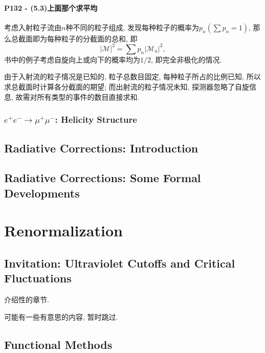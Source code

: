\documentclass[10pt,b5paper,openany]{book}
\begin{document}
\subsection{P132 - (5.3)上面那个求平均}

考虑入射粒子流由$n$种不同的粒子组成, 发现每种粒子的概率为$p_n(\sum p_n = 1)$, 那么总截面即为每种粒子的分截面的总和, 即
\begin{equation}
  |\mathcal{M}|^2 = \sum p_n |\mathcal{M}_n|^2, 
\end{equation}
书中的例子考虑自旋向上或向下的概率均为$1/2$, 即完全非极化的情况. 

由于入射流的粒子情况是已知的, 粒子总数目固定, 每种粒子所占的比例已知, 所以求总截面时计算各分截面的期望; 而出射流的粒子情况未知, 探测器忽略了自旋信息, 故需对所有类型的事件的数目直接求和. 

\section{\texorpdfstring{$e^+e^- \rightarrow \mu^+\mu^-$}:: Helicity Structure}




\clearpage

\chapter{Radiative Corrections: Introduction}

\chapter{Radiative Corrections: Some Formal Developments}

\clearpage

\part{Renormalization}

\clearpage

\chapter{Invitation: Ultraviolet Cutoffs and Critical Fluctuations}

介绍性的章节. 

可能有一些有意思的内容, 暂时跳过. 

\clearpage

\chapter{Functional Methods}
\end{document}
